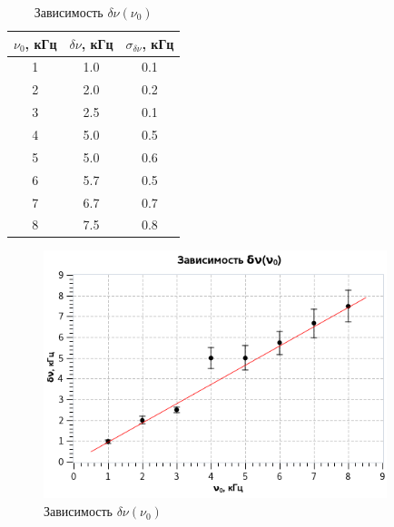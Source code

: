 \documentclass{article}
\begin{document}
   \begin{table} 
   \begin{center}
   \caption{Зависимость $\delta \nu(\nu_0)$}
   \begin{tabular}{|*{3}{c|}}
   \hline 
   $\nu_0$, кГц & $\delta \nu$, кГц & $\sigma_{\delta \nu}$, кГц\\ \hline 
   1 & 1.0 & 0.1 \\ \hline 
   2 & 2.0 & 0.2 \\ \hline 
   3 & 2.5 & 0.1 \\ \hline 
   4 & 5.0 & 0.5 \\ \hline 
   5 & 5.0 & 0.6 \\ \hline 
   6 & 5.7 & 0.5 \\ \hline 
   7 & 6.7 & 0.7 \\ \hline 
   8 & 7.5 & 0.8 \\ \hline 
   \end{tabular}
   \end{center} 
   \end{table} 

   \begin{figure}[h!]
   \centering
   \includegraphics[width=10cm]{fig10.png} 
   \caption{Зависимость $\delta \nu(\nu_0)$} 
   \label{fig.10} 
   \end{figure}

   
\end{document}

